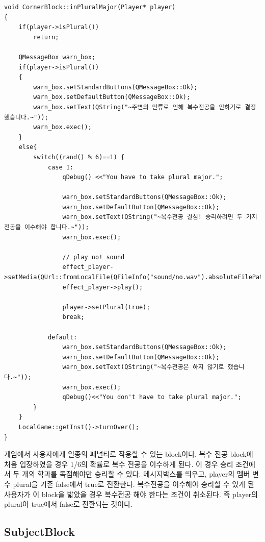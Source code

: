 \documentclass[10pt,oneside,a4paper,titlepage]{article}
\begin{document}
\begin{lstlisting}[escapeinside=~~]
void CornerBlock::inPluralMajor(Player* player)
{
    if(player->isPlural())
        return;

    QMessageBox warn_box;
    if(player->isPlural())
    {
        warn_box.setStandardButtons(QMessageBox::Ok);
        warn_box.setDefaultButton(QMessageBox::Ok);
        warn_box.setText(QString("~주변의 만류로 인해 복수전공을 안하기로 결정했습니다.~"));
        warn_box.exec();
    }
    else{
        switch((rand() % 6)==1) {
            case 1:
                qDebug() <<"You have to take plural major.";

                warn_box.setStandardButtons(QMessageBox::Ok);
                warn_box.setDefaultButton(QMessageBox::Ok);
                warn_box.setText(QString("~복수전공 결심! 승리하려면 두 가지 전공을 이수해야 합니다.~"));
                warn_box.exec();

                // play no! sound
                effect_player->setMedia(QUrl::fromLocalFile(QFileInfo("sound/no.wav").absoluteFilePath()));
                effect_player->play();

                player->setPlural(true);
                break;

            default:
                warn_box.setStandardButtons(QMessageBox::Ok);
                warn_box.setDefaultButton(QMessageBox::Ok);
                warn_box.setText(QString("~복수전공은 하지 않기로 했습니다.~"));
                warn_box.exec();
                qDebug()<<"You don't have to take plural major.";
        }
    }
    LocalGame::getInst()->turnOver();
}

\end{lstlisting}

게임에서 사용자에게 일종의 패널티로 작용할 수 있는 block이다. 복수 전공 block에 처음 입장하였을 경우 1/6의 확률로 복수 전공을 이수하게 된다. 이 경우 승리 조건에서 두 개의 학과를 독점해야만 승리할 수 있다. 메시지박스를 띄우고, player의 멤버 변수 plural을 기존 false에서 true로 전환한다. 복수전공을 이수해야 승리할 수 있게 된 사용자가 이 block을 밟았을 경우 복수전공 해야 한다는 조건이 취소된다. 즉 player의 plural이 true에서 false로 전환되는 것이다.


\subsection{SubjectBlock}
\end{document}
